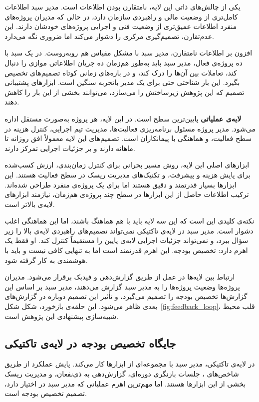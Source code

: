 یکی از چالش‌های ذاتی این لایه، نامتقارن بودن اطلاعات است. مدیر سبد
اطلاعات کامل‌تری از وضعیت مالی و راهبردی سازمان دارد، در حالی که
مدیران پروژه‌های منفرد اطلاعات عمیق‌تری از وضعیت فنی و اجرایی
پروژه‌های خودشان دارند. این عدم‌تقارن، تصمیم‌گیری مرکزی را
دشوار می‌کند اما ضروری نگه می‌دارد.

افزون بر اطلاعات نامتقارن، مدیر سبد با مشکل مقیاس هم روبه‌روست.
در یک سبد با ده پروژه‌ی فعال، مدیر سبد باید به‌طور هم‌زمان ده
جریان اطلاعاتی موازی را دنبال کند، تعاملات بین آن‌ها را درک کند،
و در بازه‌های زمانی کوتاه تصمیم‌های تخصیص بگیرد. این بار شناختی
حتی برای یک مدیر باتجربه سنگین است. ابزارهای پشتیبانی تصمیم
که این پژوهش زیرساختش را می‌سازد، می‌توانند بخشی از این بار را
کاهش دهند.

\textbf{لایه‌ی عملیاتی} پایین‌ترین سطح است. در این لایه، هر پروژه
به‌صورت مستقل اداره می‌شود. مدیر پروژه مسئول برنامه‌ریزی فعالیت‌ها،
مدیریت تیم اجرایی، کنترل هزینه در سطح فعالیت، و هماهنگی با
پیمانکاران است. تصمیم‌های این لایه معمولاً افق روزانه تا ماهانه
دارند و بر جزئیات اجرایی تمرکز دارند.

ابزارهای اصلی این لایه، روش مسیر بحرانی برای کنترل زمان‌بندی،
ارزش کسب‌شده برای پایش هزینه و پیشرفت، و تکنیک‌های مدیریت ریسک
در سطح فعالیت هستند. این ابزارها بسیار قدرتمند و دقیق هستند
اما برای یک پروژه‌ی منفرد طراحی شده‌اند. ترکیب اطلاعات حاصل از
این ابزارها در سطح چند پروژه‌ی هم‌زمان، نیازمند ابزارهای لایه‌ی
بالاتر است.

نکته‌ی کلیدی این است که این سه لایه باید با هم هماهنگ باشند، اما
این هماهنگی اغلب دشوار است. مدیر سبد در لایه‌ی تاکتیکی نمی‌تواند
تصمیم‌های راهبردی لایه‌ی بالا را زیر سؤال ببرد، و نمی‌تواند
جزئیات اجرایی لایه‌ی پایین را مستقیماً کنترل کند. او فقط یک اهرم
دارد: تخصیص بودجه. این اهرم قدرتمند است اما به تنهایی کافی نیست
و باید با هوشمندی به کار گرفته شود.

ارتباط بین لایه‌ها در عمل از طریق گزارش‌دهی و فیدبک برقرار می‌شود.
مدیران پروژه‌ها وضعیت پروژه‌ها را به مدیر سبد گزارش می‌دهند،
مدیر سبد بر اساس این گزارش‌ها تخصیص بودجه را تصمیم می‌گیرد، و
تأثیر این تصمیم دوباره در گزارش‌های بعدی ظاهر می‌شود. این
حلقه‌ی بازخورد، شکل شکل~\ref{fig:feedback_loop}، قلب محیط
شبیه‌سازی پیشنهادی این پژوهش است.

\subsection{جایگاه تخصیص بودجه در لایه‌ی تاکتیکی}
\label{subsec:budget_allocation_role}

در لایه‌ی تاکتیکی، مدیر سبد با مجموعه‌ای از ابزارها کار می‌کند.
پایش عملکرد از طریق شاخص‌های ، جلسات بازنگری دوره‌ای،
گزارش‌دهی به ذی‌نفعان، و مدیریت ریسک بخشی از این ابزارها هستند.
اما مهم‌ترین اهرم عملیاتی که مدیر سبد در اختیار دارد، تصمیم
تخصیص بودجه است.

